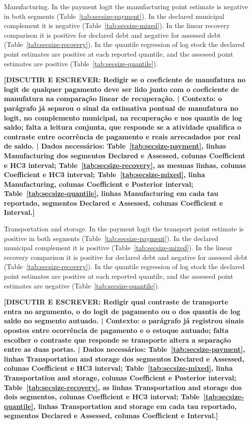 Manufacturing.
In the payment logit the manufacturing point estimate is negative in both segments (Table~\ref{tab:secsize-payment}).
In the declared municipal complement it is negative (Table~\ref{tab:secsize-mixed}).
In the linear recovery comparison it is positive for declared debt and negative for assessed debt (Table~\ref{tab:secsize-recovery}).
In the quantile regression of log stock the declared point estimates are positive at each reported quantile, and the assessed point estimates are positive (Table~\ref{tab:secsize-quantile}).

\textbf{[DISCUTIR E ESCREVER: Redigir se o coeficiente de manufatura no logit de qualquer pagamento deve ser lido junto com o coeficiente de manufatura na comparação linear de recuperação. | Contexto: o parágrafo já separou o sinal da estimativa pontual de manufatura no logit, no complemento municipal, na recuperação e nos quantis de log saldo; falta a leitura conjunta, que responde se a atividade qualifica o contraste entre ocorrência de pagamento e reais arrecadados por real de saldo. | Dados necessários: Table~\ref{tab:secsize-payment}, linhas Manufacturing dos segmentos Declared e Assessed, colunas Coefficient e HC3 interval; Table~\ref{tab:secsize-recovery}, as mesmas linhas, colunas Coefficient e HC3 interval; Table~\ref{tab:secsize-mixed}, linha Manufacturing, colunas Coefficient e Posterior interval; Table~\ref{tab:secsize-quantile}, linhas Manufacturing em cada tau reportado, segmentos Declared e Assessed, colunas Coefficient e Interval.]}

Transportation and storage.
In the payment logit the transport point estimate is positive in both segments (Table~\ref{tab:secsize-payment}).
In the declared municipal complement it is positive (Table~\ref{tab:secsize-mixed}).
In the linear recovery comparison it is positive for declared debt and negative for assessed debt (Table~\ref{tab:secsize-recovery}).
In the quantile regression of log stock the declared point estimates are positive at each reported quantile, and the assessed point estimates are negative (Table~\ref{tab:secsize-quantile}).

\textbf{[DISCUTIR E ESCREVER: Redigir qual contraste de transporte entra no argumento, o do logit de pagamento ou o dos quantis de log saldo no segmento autuado. | Contexto: o parágrafo já registrou sinais opostos entre ocorrência de pagamento e o estoque autuado; falta escolher o contraste que responde se transporte altera a separação entre as duas portas. | Dados necessários: Table~\ref{tab:secsize-payment}, linhas Transportation and storage dos segmentos Declared e Assessed, colunas Coefficient e HC3 interval; Table~\ref{tab:secsize-mixed}, linha Transportation and storage, colunas Coefficient e Posterior interval; Table~\ref{tab:secsize-recovery}, as linhas Transportation and storage dos dois segmentos, colunas Coefficient e HC3 interval; Table~\ref{tab:secsize-quantile}, linhas Transportation and storage em cada tau reportado, segmentos Declared e Assessed, colunas Coefficient e Interval.]}


